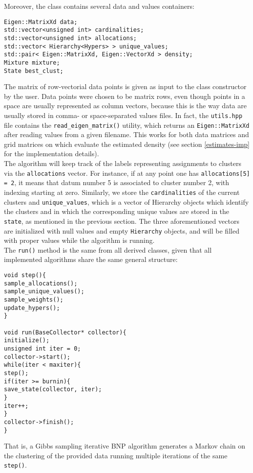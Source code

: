 Moreover, the class contains several data and values containers:
\begin{verbatim}
Eigen::MatrixXd data;
std::vector<unsigned int> cardinalities;
std::vector<unsigned int> allocations;
std::vector< Hierarchy<Hypers> > unique_values;
std::pair< Eigen::MatrixXd, Eigen::VectorXd > density;
Mixture mixture;
State best_clust;
\end{verbatim}
The matrix of row-vectorial data points is given as input to the class constructor by the user.
Data points were chosen to be matrix rows, even though points in a space are usually represented as column vectors, because this is the way data are usually stored in comma- or space-separated values files.
In fact, the \verb|utils.hpp| file contains the \verb|read_eigen_matrix()| utility, which returns an \verb|Eigen::MatrixXd| after reading values from a given filename.
This works for both data matrices and grid matrices on which evaluate the estimated density (see section \ref{estimates-imp} for the implementation details). \\
The algorithm will keep track of the labels representing assignments to clusters via the \verb|allocations| vector.
For instance, if at any point one has \verb|allocations[5] = 2|, it means that datum number 5 is associated to cluster number 2, with indexing starting at zero.
Similarly, we store the \verb|cardinalities| of the current clusters and \verb|unique_values|, which is a vector of Hierarchy objects which identify the clusters and in which the corresponding unique values are stored in the \verb|state|, as mentioned in the previous section.
The three aforementioned vectors are initialized with null values and empty \verb|Hierarchy| objects, and will be filled with proper values while the algorithm is running. \\
The \verb|run()| method is the same from all derived classes, given that all implemented algorithms share the same general structure:
\begin{verbatim}
void step(){
sample_allocations();
sample_unique_values();
sample_weights();
update_hypers();
}

void run(BaseCollector* collector){
initialize();
unsigned int iter = 0;
collector->start();
while(iter < maxiter){
step();
if(iter >= burnin){
save_state(collector, iter);
}
iter++;
}
collector->finish();
}    
\end{verbatim}
That is, a Gibbs sampling iterative BNP algorithm generates a Markov chain on the clustering of the provided data running multiple iterations of the same \verb|step()|.
